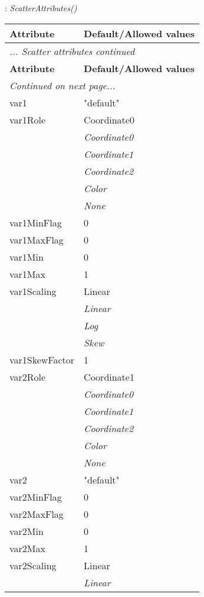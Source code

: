 \documentclass[10pt,a4paper]{report}
\begin{document}
\newpage

{}
: {\it ScatterAttributes() }\\[-3mm]

\begin{longtable}{ll}
{\bf Attribute} & {\bf Default/Allowed values} \\
\hline \hline
\endfirsthead
\multicolumn{2}{l}{{\it ... Scatter attributes continued}} \\
{\bf Attribute} & {\bf Default/Allowed values} \\
\hline \hline
\endhead
\hline
\multicolumn{2}{l}{{\it Continued on next page...}} \\
\endfoot
\hline
\endlastfoot

var1  &  "default" \\
var1Role  &  Coordinate0   \\
 & {\it  Coordinate0} \\
 & {\it  Coordinate1} \\
 & {\it  Coordinate2} \\
 & {\it  Color} \\
 & {\it  None} \\
var1MinFlag  &  0 \\
var1MaxFlag  &  0 \\
var1Min  &  0 \\
var1Max  &  1 \\
var1Scaling  &  Linear   \\
 & {\it  Linear} \\
 & {\it  Log} \\
 & {\it  Skew} \\
var1SkewFactor  &  1 \\
var2Role  &  Coordinate1   \\
 & {\it  Coordinate0} \\
 & {\it  Coordinate1} \\
 & {\it  Coordinate2} \\
 & {\it  Color} \\
 & {\it  None} \\
var2  &  "default" \\
var2MinFlag  &  0 \\
var2MaxFlag  &  0 \\
var2Min  &  0 \\
var2Max  &  1 \\
var2Scaling  &  Linear   \\
 & {\it  Linear} \\

\end{longtable}
\end{document}
